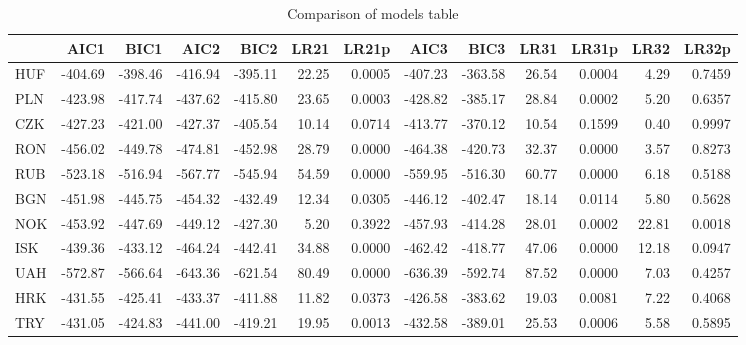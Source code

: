\documentclass[12pt, a4paper, oneside]{article} %
\begin{document}
\begin{landscape}
\begin{table}[ht]
\centering
\begin{tabular}{l|rrrrrrrrrrrr}
  \hline
 & AIC1 & BIC1 & AIC2 & BIC2 & LR21 & LR21p & AIC3 & BIC3 & LR31 & LR31p & LR32 & LR32p \\ 
  \hline
HUF & -404.69 & -398.46 & -416.94 & -395.11 & 22.25 & 0.0005 & -407.23 & -363.58 & 26.54 & 0.0004 & 4.29 & 0.7459 \\ 
  PLN & -423.98 & -417.74 & -437.62 & -415.80 & 23.65 & 0.0003 & -428.82 & -385.17 & 28.84 & 0.0002 & 5.20 & 0.6357 \\ 
  CZK & -427.23 & -421.00 & -427.37 & -405.54 & 10.14 & 0.0714 & -413.77 & -370.12 & 10.54 & 0.1599 & 0.40 & 0.9997 \\ 
  RON & -456.02 & -449.78 & -474.81 & -452.98 & 28.79 & 0.0000 & -464.38 & -420.73 & 32.37 & 0.0000 & 3.57 & 0.8273 \\ 
  RUB & -523.18 & -516.94 & -567.77 & -545.94 & 54.59 & 0.0000 & -559.95 & -516.30 & 60.77 & 0.0000 & 6.18 & 0.5188 \\ 
  BGN & -451.98 & -445.75 & -454.32 & -432.49 & 12.34 & 0.0305 & -446.12 & -402.47 & 18.14 & 0.0114 & 5.80 & 0.5628 \\ 
  NOK & -453.92 & -447.69 & -449.12 & -427.30 & 5.20 & 0.3922 & -457.93 & -414.28 & 28.01 & 0.0002 & 22.81 & 0.0018 \\ 
  ISK & -439.36 & -433.12 & -464.24 & -442.41 & 34.88 & 0.0000 & -462.42 & -418.77 & 47.06 & 0.0000 & 12.18 & 0.0947 \\ 
  UAH & -572.87 & -566.64 & -643.36 & -621.54 & 80.49 & 0.0000 & -636.39 & -592.74 & 87.52 & 0.0000 & 7.03 & 0.4257 \\ 
  HRK & -431.55 & -425.41 & -433.37 & -411.88 & 11.82 & 0.0373 & -426.58 & -383.62 & 19.03 & 0.0081 & 7.22 & 0.4068 \\ 
  TRY & -431.05 & -424.83 & -441.00 & -419.21 & 19.95 & 0.0013 & -432.58 & -389.01 & 25.53 & 0.0006 & 5.58 & 0.5895 \\ 
   \hline
\end{tabular}
\caption{Comparison of models table} 
\label{tabref:comptab}
\end{table}
\end{landscape}
\end{document}
